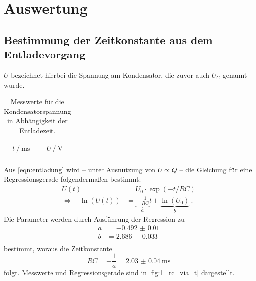 \section{Auswertung}

\subsection{Bestimmung der Zeitkonstante aus dem Entladevorgang}
\label{auswertung:1}

$U$ bezeichnet hierbei die Spannung am Kondensator, die zuvor auch $U_C$ genannt wurde.

\begin{table}
  \centering
  \caption{Messwerte für die Kondensatorspannung in Abhängigkeit der Entladezeit.}
  \label{tab:mess_1}
  \begin{tabular}{S[table-format=1.1] S[table-format=2.1]}
  \toprule
  $t \mathbin{/} \si{\milli\second}$ &
  $U \mathbin{/} \si{\volt}$ \\
  \midrule
  \bottomrule
  \end{tabular}
\end{table}

Aus \autoref{eqn:entladung} wird
– unter Ausnutzung von $U \propto Q$ –
die Gleichung für eine Regressionsgerade folgendermaßen bestimmt:
\begin{align*}
  U(t) &= U_0 \cdot \exp(-t / RC) \\
  \Leftrightarrow \quad
  \ln(U(t)) &= \underbrace{-\frac{1}{RC}}_a t
  + \underbrace{\ln(U_0)}_b \ .
\end{align*}
Die Parameter werden durch Ausführung der Regression zu
\begin{align*}
  a &= \num{-0.492(10)} \\
  b &= \num{2.686(33)} \\
\end{align*}
bestimmt, woraus die Zeitkonstante
\[ RC = -\frac{1}{a} = \SI{2.03(4)}{\milli\second} \]
folgt.
Messwerte und Regressionsgerade sind in \autoref{fig:1_rc_via_t} dargestellt.

